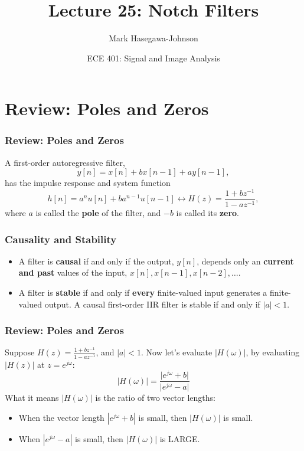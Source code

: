 \documentclass{beamer}
\title{Lecture 25: Notch Filters}
\author{Mark Hasegawa-Johnson}
\date{ECE 401: Signal and Image Analysis}
\begin{document}
\begin{frame}
  \maketitle
\end{frame}

\begin{frame}
  \tableofcontents
\end{frame}

\section[Review]{Review: Poles and Zeros}
\setcounter{subsection}{1}

\begin{frame}
  \frametitle{Review: Poles and Zeros}
  A first-order autoregressive filter,
  \[
  y[n] = x[n]+bx[n-1]+ay[n-1],
  \]
  has the impulse response and system function
  \[
  h[n]=a^n u[n]+ba^{n-1}u[n-1] \leftrightarrow H(z)  = \frac{1+bz^{-1}}{1-az^{-1}},
  \]
  where $a$ is called the {\bf pole} of the filter, and $-b$ is called
  its {\bf zero}.
\end{frame}

\begin{frame}
  \frametitle{Causality and Stability}
  \begin{itemize}
  \item A filter is {\bf causal} if and only if the output, $y[n]$,
    depends only an {\bf current and past} values of the input, $x[n],
    x[n-1],x[n-2],\ldots$.
  \item A filter is {\bf stable} if and only if {\bf every}
    finite-valued input generates a finite-valued output.  A causal
    first-order IIR filter is stable if and only if $|a|<1$.
  \end{itemize}
\end{frame}

\begin{frame}
  \frametitle{Review: Poles and Zeros}

  Suppose $H(z)=\frac{1+bz^{-1}}{1-az^{-1}}$, and $|a|<1$.  Now let's
  evaluate $|H(\omega)|$, by evaluating $|H(z)|$ at $z=e^{j\omega}$:
  \[
  \vert H(\omega)\vert = 
  \frac{\vert e^{j\omega}+b\vert}{\vert e^{j\omega}-a\vert}
  \]
  What it means $|H(\omega)|$ is the ratio of two vector lengths:
  \begin{itemize}
  \item When the vector length $|e^{j\omega}+b|$ is small, then
    $|H(\omega)|$ is small.
  \item When $|e^{j\omega}-a|$ is small, then $|H(\omega)|$ is LARGE.
  \end{itemize}
\end{frame}
\end{document}
